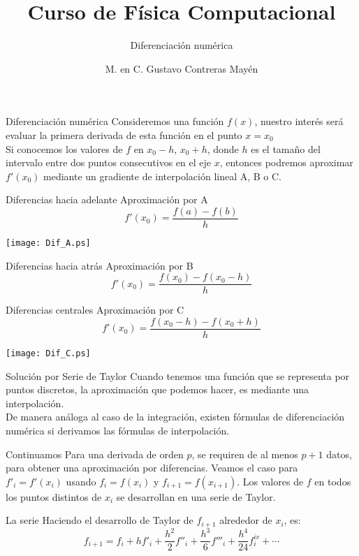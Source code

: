 \documentclass[pdf, azure]{prosper}
\title{Curso de Física Computacional}
\subtitle{Diferenciación numérica}
\author{M. en C. Gustavo Contreras Mayén}
\begin{document}
\maketitle
\begin{slide}{Diferenciación numérica}
Consideremos una función $f(x)$, nuestro interés será evaluar la primera derivada de esta función en el punto $x = x_{0}$
\\
Si conocemos los valores de $f$ en $x_{0}-h$, $x_{0}+h$, donde $h$ es el tamaño del intervalo entre dos puntos consecutivos en el eje $x$, entonces podremos aproximar $f'(x_{0})$ mediante un gradiente de interpolación lineal A, B o C.
\end{slide}
\begin{slide}{Diferencias hacia adelante}
Aproximación por A
\[ f'(x_{0})=  \dfrac{f(a)-f(b)}{h} \]
\begin{center}
	\texttt{[image: Dif\_A.ps]} 
\end{center}
\end{slide}
\begin{slide}{Diferencias hacia atrás}
Aproximación por B
\[ f'(x_{0}) = \dfrac{f(x_{0})-f(x_{0}-h)}{h} \]
\end{slide}
\begin{slide}{Diferencias centrales}
Aproximación por C
\[ f'(x_{0}) = \dfrac{f(x_{0}-h)-f(x_{0}+h)}{h} \]
\begin{center}
	\texttt{[image: Dif\_C.ps]} 
\end{center}
\end{slide}
\begin{slide}{Solución por Serie de Taylor}
Cuando tenemos una función que se representa por puntos discretos, la aproximación que podemos hacer, es mediante una interpolación.
\\
De manera análoga al caso de la integración, existen fórmulas de diferenciación numérica si derivamos las fórmulas de interpolación.
\end{slide}
\begin{slide}{Continuamos}
Para una derivada de orden $p$, se requiren de al menos $p+1$ datos, para obtener una aproximación por diferencias.
\bigskip
Veamos el caso para $f'_{i} = f'(x_{i})$ usando $f_{i}=f(x_{i})$ y $f_{i+1}=f(x_{i+1})$. Los valores de $f$ en todos los puntos distintos de $x_{i}$ se desarrollan en una serie de Taylor.
\end{slide}
\begin{slide}{La serie}
Haciendo el desarrollo de Taylor de $f_{i+1}$ alrededor de $x_{i}$, es:
\[ f_{i+1} = f_{i} + hf'_{i} + \dfrac{h^{2}}{2} f''_{i} + \dfrac{h^{3}}{6} f'''_{i} + \dfrac{h^{4}}{24} f^{iv}_{i} + \cdots \]
\end{slide}
\end{document}
